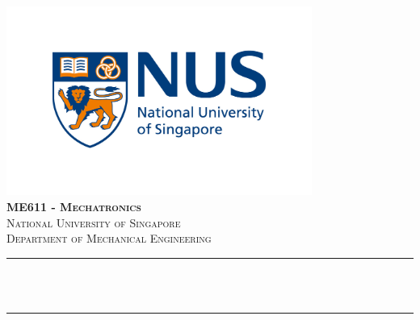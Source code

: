 \begin{titlepage}

\newcommand{\HRule}{\rule{\linewidth}{0.5mm}} %





\begin{center} %


\includegraphics[width = 10cm]{./figures/nus}\\[1.0cm] 
\textbf{\textsc{\Large ME611 - Mechatronics}}\\[1.0cm] 
\textsc{\Large National University of Singapore}\\[0.5cm] 
\textsc{\large Department of Mechanical Engineering}\\[0.95cm] 


\HRule \\[0.4cm]
{ \huge \bfseries \reporttitle}\\ %
\HRule \\[1.5cm]
\end{center}


\end{titlepage}
